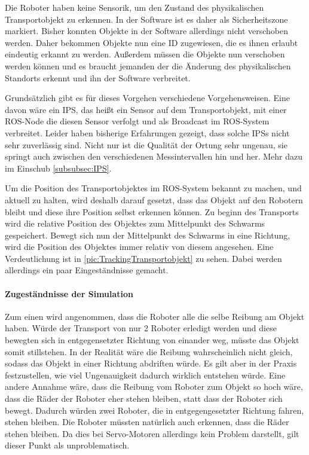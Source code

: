 Die Roboter haben keine Sensorik, um den Zustand des physikalischen Transportobjekt zu erkennen. In der Software ist es daher als Sicherheitszone markiert. Bisher konnten Objekte in der Software allerdings nicht verschoben werden. Daher bekommen Objekte nun eine ID zugewiesen, die es ihnen erlaubt eindeutig erkannt zu werden. Außerdem müssen die Objekte nun verschoben werden können und es braucht jemanden der die Änderung des physikalischen Standorts erkennt und ihn der Software verbreitet.

Grundsätzlich gibt es für dieses Vorgehen verschiedene Vorgehensweisen. Eine davon wäre ein \ac{IPS}, das heißt ein Sensor auf dem Transportobjekt, mit einer \ac{ROS}-Node die diesen Sensor verfolgt und als Broadcast im \ac{ROS}-System verbreitet. Leider haben bisherige Erfahrungen gezeigt, dass solche \ac{IPS}s nicht sehr zuverlässig sind. Nicht nur ist die Qualität der Ortung sehr ungenau, sie springt auch zwischen den verschiedenen Messintervallen hin und her. Mehr dazu im Einschub \autoref{subsubsec:IPS}.

Um die Position des Transportobjektes im \ac{ROS}-System bekannt zu machen, und aktuell zu halten, wird deshalb darauf gesetzt, dass das Objekt auf den Robotern bleibt und diese ihre Position selbst erkennen können. Zu beginn des Transports wird die relative Position des Objektes zum Mittelpunkt des Schwarms gespeichert. Bewegt sich nun der Mittelpunkt des Schwarms in eine Richtung, wird die Position des Objektes immer relativ von diesem angesehen. Eine Verdeutlichung ist in \autoref{pic:TrackingTransportobjekt} zu sehen. Dabei werden allerdings ein paar Eingeständnisse gemacht.

\paragraph*{Zugeständnisse der Simulation}
Zum einen wird angenommen, dass die Roboter alle die selbe Reibung am Objekt haben. Würde der Transport von nur 2 Roboter erledigt werden und diese bewegten sich in entgegensetzter Richtung von einander weg, müsste das Objekt somit stillstehen. In der Realität wäre die Reibung wahrscheinlich nicht gleich, sodass das Objekt in einer Richtung abdriften würde. Es gilt aber in der Praxis festzustellen, wie viel Ungenauigkeit dadurch wirklich entstehen würde.
Eine andere Annahme wäre, dass die Reibung vom Roboter zum Objekt so hoch wäre, dass die Räder der Roboter eher stehen bleiben, statt dass der Roboter sich bewegt. Dadurch würden zwei Roboter, die in entgegengesetzter Richtung fahren, stehen bleiben. Die Roboter müssten natürlich auch erkennen, dass die Räder stehen bleiben. Da dies bei Servo-Motoren allerdings kein Problem darstellt, gilt dieser Punkt als unproblematisch.

